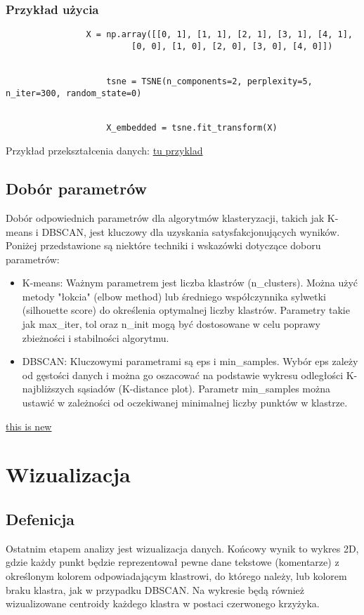 			
		\subsubsection{Przykład użycia}
			\begin{verbatim}
				X = np.array([[0, 1], [1, 1], [2, 1], [3, 1], [4, 1],
             			 [0, 0], [1, 0], [2, 0], [3, 0], [4, 0]])


					tsne = TSNE(n_components=2, perplexity=5, n_iter=300, random_state=0)


					X_embedded = tsne.fit_transform(X)
			\end{verbatim}
			
			
			Przykład przekształcenia danych:
				\underline{tu przyklad}
		
	\subsection{Dobór parametrów}
		Dobór odpowiednich parametrów dla algorytmów klasteryzacji, takich jak K-means i DBSCAN, jest kluczowy dla uzyskania satysfakcjonujących wyników. Poniżej przedstawione są niektóre techniki i wskazówki dotyczące doboru parametrów:
		
		\begin{itemize}
			\item K-means: Ważnym parametrem jest liczba klastrów (n\_clusters). Można użyć metody "łokcia" (elbow method) lub średniego współczynnika sylwetki (silhouette score) do określenia optymalnej liczby klastrów. Parametry takie jak max\_iter, tol oraz n\_init mogą być dostosowane w celu poprawy zbieżności i stabilności algorytmu.
			\item DBSCAN: Kluczowymi parametrami są eps i min\_samples. Wybór eps zależy od gęstości danych i można go oszacować na podstawie wykresu odległości K-najbliższych sąsiadów (K-distance plot). Parametr min\_samples można ustawić w zależności od oczekiwanej minimalnej liczby punktów w klastrze.
		\end{itemize}
		
		\underline{this is new}
			
	
	
\section{Wizualizacja}
	\subsection{Defenicja}
		Ostatnim etapem analizy jest wizualizacja danych. Końcowy wynik to wykres 2D, gdzie każdy punkt będzie reprezentował pewne dane tekstowe (komentarze) z określonym kolorem odpowiadającym klastrowi, do którego należy, lub kolorem braku klastra, jak w przypadku DBSCAN. Na wykresie będą również wizualizowane centroidy każdego klastra w postaci czerwonego krzyżyka.
	
